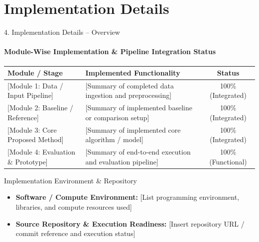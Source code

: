 \documentclass[aspectratio=169, 11pt]{beamer}
\begin{document}
\section{Implementation Details}

\begin{frame}{4. Implementation Details -- Overview}
    \framesubtitle{Module-Wise Implementation \& Pipeline Integration Status}
    \begin{table}
        \centering
        \footnotesize
        \renewcommand{\arraystretch}{1.25}
        \begin{tabular}{p{3.6cm} p{6.2cm} c}
            \toprule
            \textbf{Module / Stage} & \textbf{Implemented Functionality} & \textbf{Status} \\
            \midrule
            {[Module 1: Data / Input Pipeline]} & {[Summary of completed data ingestion and preprocessing]} & 100\% (Integrated) \\
            {[Module 2: Baseline / Reference]} & {[Summary of implemented baseline or comparison setup]} & 100\% (Integrated) \\
            {[Module 3: Core Proposed Method]} & {[Summary of implemented core algorithm / model]} & 100\% (Integrated) \\
            {[Module 4: Evaluation \& Prototype]} & {[Summary of end-to-end execution and evaluation pipeline]} & 100\% (Functional) \\
            \bottomrule
        \end{tabular}
    \end{table}

    \begin{block}{Implementation Environment \& Repository}
        \footnotesize
        \begin{itemize}
            \item \textbf{Software / Compute Environment:} {[List programming environment, libraries, and compute resources used]}
            \item \textbf{Source Repository \& Execution Readiness:} {[Insert repository URL / commit reference and execution status]}
        \end{itemize}
    \end{block}
\end{frame}
\end{document}
